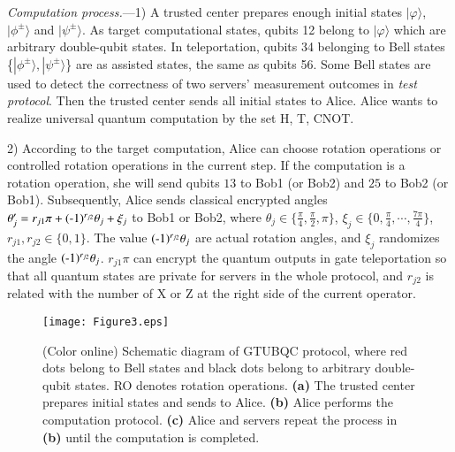 \documentclass[aps,pra,showpacs,twocolumn,superscriptaddress]{revtex4-1}
\begin{document}
\emph{Computation process.}---1) A trusted center prepares enough initial states $|\varphi\rangle$, $|\phi^\pm\rangle$ and $|\psi^\pm\rangle$. As target computational states, qubits 12 belong to $|\varphi\rangle$ which are arbitrary double-qubit states. In teleportation, qubits 34 belonging to Bell states \{$|\phi^\pm\rangle, |\psi^\pm\rangle$\} are as assisted states, the same as qubits 56. Some Bell states are used to detect the correctness of two servers' measurement outcomes in \emph{test protocol}. Then the trusted center sends all initial states to Alice. Alice wants to realize universal quantum computation by the set H, T, CNOT.

2) According to the target computation, Alice can choose rotation operations or controlled rotation operations in the current step. If the computation is a rotation operation, she will send qubits $13$ to Bob1 (or Bob2) and $25$ to Bob2 (or Bob1). Subsequently, Alice sends classical encrypted angles $\theta'_j=r_{j1}\pi+(\textnormal{-}1)^{r_{j2}}\theta_j+\xi_j$ to Bob1 or Bob2, where $\theta_j\in\{\frac{\pi}{4}, \frac{\pi}{2}, \pi\}$, $\xi_j\in\{0, \frac{\pi}{4}, \cdots, \frac{7\pi}{4}\}$, $r_{j1}, r_{j2}\in\{0,1\}$. The value $(\textnormal{-}1)^{r_{j2}}\theta_j$ are actual rotation angles, and $\xi_j$ randomizes the angle $(\textnormal{-}1)^{r_{j2}}\theta_j$. $r_{j1}\pi$ can encrypt the quantum outputs in gate teleportation so that all quantum states are private for servers in the whole protocol, and ${r_{j2}}$ is related with the number of X or Z at the right side of the current operator.

\begin{figure*}[!htp]
  \centering
  \texttt{[image: Figure3.eps]}
  \caption{(Color online) Schematic diagram of GTUBQC protocol, where red dots belong to Bell states and black dots belong to arbitrary double-qubit states. RO denotes rotation operations. \textbf{(a)} The trusted center prepares initial states and sends to Alice. \textbf{(b)} Alice performs the computation protocol. \textbf{(c)} Alice and servers repeat the process in \textbf{(b)} until the computation is completed.}\label{F3}
\end{figure*}
\end{document}
